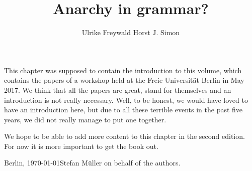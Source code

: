 \documentclass[output=paper
  ,nobabel
  ,draftmode
  ,colorlinks, citecolor=brown
]{langscibook}
\title{Anarchy in grammar?}
\author{Ulrike Freywald\orcid{0000-0003-3268-7874}\affiliation{TU Dortmund} \lastand Horst J. Simon\orcid{0000-0002-6367-2969}\affiliation{Freie Universität Berlin}}
\begin{document}
\maketitle

This chapter was supposed to contain the introduction to this volume, which contains the papers of a
workshop held at the Freie Universität Berlin in May 2017. We think that all the papers are great, stand
for themselves and an introduction is not really necessary. Well, to be honest, we would have loved
to have an introduction here, but due to all these terrible events in the past five years, we did
not really manage to put one together.

We hope to be able to add more content to this chapter in the second edition. For now it is more
important to get the book out.


\bigskip
\noindent
Berlin, \today Stefan Müller on behalf of the authors.

{\sloppy
\printbibliography[heading=subbibliography,notkeyword=this]
}
\end{document}
